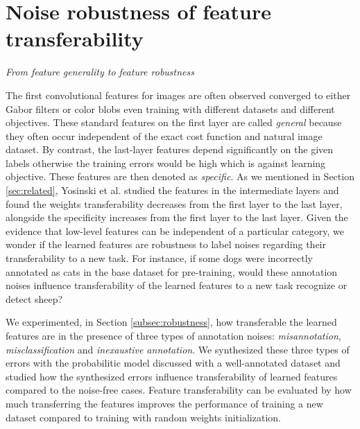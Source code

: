 \section{Noise robustness of feature transferability}
\label{sec:robustness}


\noindent \textit{From feature generality to feature robustness}

\noindent
The first convolutional features for images are often observed converged to either Gabor filters or color blobs even training with different datasets and different objectives\cite{zeiler2014visualizing,lee2009convolutional,krizhevsky2012imagenet,shin2016deep}.
These standard features on the first layer are called \textit{general} because they often occur independent of the exact cost function and natural image dataset.
By contrast, the last-layer features depend significantly on the given labels otherwise the training errors would be high which is against learning objective.
These features are then denoted as \textit{specific}.
As we mentioned in Section \ref{sec:related}, Yosinski et al. \cite{yosinski2014transferable} studied the features in the intermediate layers and found the weights transferability decreases from the first layer to the last layer, alongside the specificity increases from the first layer to the last layer.
Given the evidence that low-level features can be independent of a particular category, we wonder if the learned features are robustness to label noises regarding their transferability to a new task.
For instance, if some dogs were incorrectly annotated as cats in the base dataset for pre-training, would these annotation noises influence transferability of the learned features to a new task recognize or detect sheep?

\noindent
We experimented, in Section \ref{subsec:robustness}, how transferable the learned features are in the presence of three types of annotation noises: \textit{misannotation}, \textit{misclassification} and \textit{inexaustive annotation}.
We synthesized these three types of errors with the probabilitic model discussed with a well-annotated dataset and studied how the synthesized errors influence transferability of learned features compared to the noise-free cases.
Feature transferability can be evaluated by how much transferring the features improves the performance of training a new dataset compared to training with random weights initialization. \cite{yosinski2014transferable}


